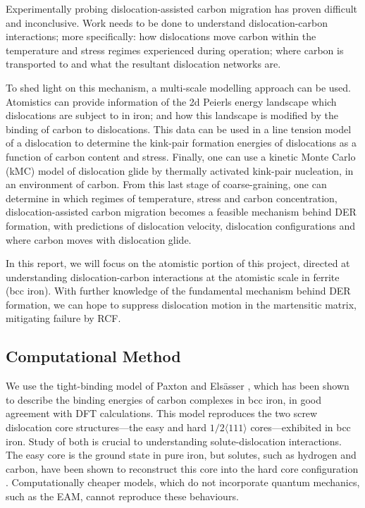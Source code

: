\documentclass[a4paper,11pt]{article}
\numberwithin{equation}{chapter}
\numberwithin{listing}{chapter}
\begin{document}
Experimentally probing dislocation-assisted carbon migration has proven difficult and inconclusive. Work needs to be done
to understand dislocation-carbon interactions; more specifically: how dislocations move carbon
within the temperature and stress regimes experienced during operation; where carbon is
transported to and what the resultant dislocation networks are.


To shed light on this mechanism, a multi-scale modelling approach can be
used. Atomistics can provide information of the 2d Peierls energy landscape which dislocations are
subject to in iron; and how this landscape is modified by the binding of carbon to
dislocations. This data can be used in a line tension model of a dislocation to determine the
kink-pair formation energies of dislocations as a function of carbon content and stress. Finally,
one can use a kinetic Monte Carlo (kMC) model of dislocation glide by thermally activated
kink-pair nucleation, in an environment of carbon. From this last stage of coarse-graining, one
can determine in which regimes of temperature, stress and carbon concentration,
dislocation-assisted carbon migration becomes a feasible mechanism behind DER formation, with
predictions of dislocation velocity, dislocation configurations and where carbon moves with
dislocation glide.

In this report, we will focus on the atomistic portion of this project,
directed at understanding dislocation-carbon interactions at the atomistic scale in ferrite (bcc
iron).
With further knowledge of the fundamental mechanism behind DER formation, we can hope to suppress
dislocation motion in the martensitic matrix, mitigating failure by RCF.



\subsection{Computational Method}
\label{sec:org5e1b108}


We use the tight-binding model of Paxton and Elsässer \cite{Paxton2013}, which has been shown to
describe the binding energies of carbon complexes in bcc iron, in good agreement with DFT
calculations. This model reproduces the two screw dislocation core structures---the easy and hard
\(1/2\langle 111 \rangle\) cores---exhibited in bcc iron. Study of both is crucial to understanding
solute-dislocation interactions. The easy core is the ground state in pure iron, but solutes, such
as hydrogen and carbon, have been shown to reconstruct this core into the hard core
configuration \cite{Ventelon2015,itakura13_effec_hydrog_atoms_screw_disloc}. Computationally cheaper
models, which do not incorporate quantum mechanics, such as the EAM, cannot reproduce these
behaviours.
\end{document}
